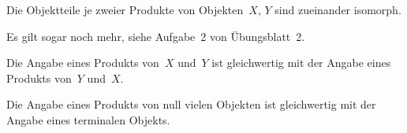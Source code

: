 \begin{prop}Die Objektteile je zweier Produkte von Objekten~$X$, $Y$ sind
zueinander isomorph.\end{prop}

\begin{bem}Es gilt sogar noch mehr, siehe Aufgabe~2 von Übungsblatt~2.\end{bem}

\begin{prop}Die Angabe eines Produkts von~$X$ und~$Y$ ist gleichwertig mit der
Angabe eines Produkts von~$Y$ und~$X$.\end{prop}

\begin{prop}Die Angabe eines Produkts von null vielen Objekten ist gleichwertig
mit der Angabe eines terminalen Objekts.\end{prop}
